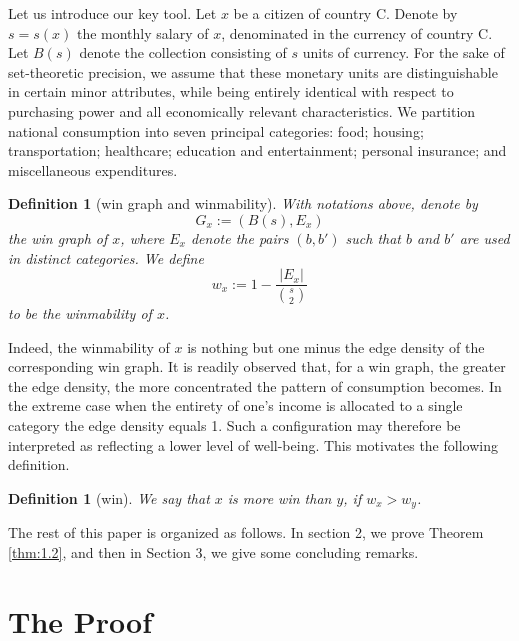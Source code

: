 \documentclass[AER]{AEA}
\newtheorem{definition}[theorem]{Definition}
\begin{document}
Let us introduce our key tool. Let $x$ be a citizen of country C. Denote by $s=s(x)$ the monthly salary of $x$, denominated in the currency of country C. Let $B(s)$ denote the collection consisting of $s$ units of currency. For the sake of set-theoretic precision, we assume that these monetary units are distinguishable in certain minor attributes, while being entirely identical with respect to purchasing power and all economically relevant characteristics. We partition national consumption into seven principal categories: food; housing; transportation; healthcare; education and entertainment; personal insurance; and miscellaneous expenditures.

\begin{definition}[win graph and winmability]
With notations above, denote by
$$G_{x} := (B(s), E_{x})$$
the win graph of $x$, where $E_{x}$ denote the pairs $(b, b')$ such that $b$ and $b'$ are used in distinct categories. We define
$$w_{x} := 1 - \frac{|E_{x}|}{\binom{s}{2}}$$
to be the winmability of $x$.
\end{definition}

Indeed, the winmability of $x$ is nothing but one minus the edge density of the corresponding win graph. It is readily observed that, for a win graph, the greater the edge density, the more concentrated the pattern of consumption becomes. In the extreme case when the entirety of one's income is allocated to a single category the edge density equals 1. Such a configuration may therefore be interpreted as reflecting a lower level of well-being. This motivates the following definition.

\begin{definition}[win]
We say that $x$ is more win than $y$, if $w_{x} > w_{y}$.
\end{definition}

The rest of this paper is organized as follows. In section 2, we prove Theorem \ref{thm:1.2}, and then in Section 3, we give some concluding remarks.

\section{The Proof}
\end{document}
